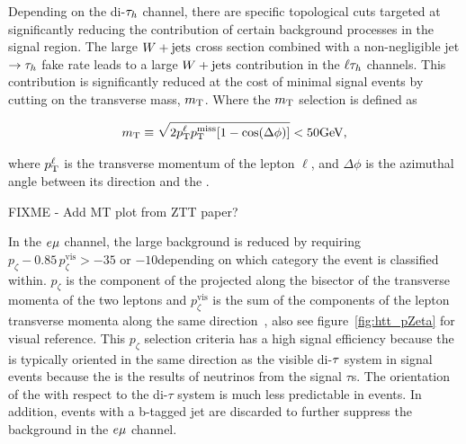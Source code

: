 Depending on the di-$\tau_{h}$ channel, there are specific topological cuts targeted at significantly
reducing the contribution of certain background processes in the signal region.  The large $W+\text{jets}$
cross section combined with a non-negligible jet $\to \tau_{h}$ fake rate leads to a large $W+\text{jets}$
contribution in the $\ell\tau_{h}$ channels.  This contribution is significantly reduced at the cost of
minimal signal events by cutting on the transverse mass, $m_\mathrm{T}$.  Where the $m_\mathrm{T}$ selection is defined as

\begin{equation}
m_\mathrm{T} \equiv \sqrt{\smash[b]{2 p_\mathrm{T}^\ell p_\mathrm{T}^\text{miss} [1-\cos(\Delta\phi)]}} < 50\mathrm{GeV},
\end{equation}

where $p_\mathrm{T}^\ell$ is the transverse momentum of the lepton $\ell$,
and $\Delta\phi$ is the azimuthal angle between its direction and the \etvecmiss.

FIXME - Add MT plot from ZTT paper?

In the $e\mu$ channel, the large \ttbar background is reduced by requiring 
$p_\zeta - 0.85 \, p_\zeta^{\text{vis}} > -35$ or $-10$\GeV depending on which category the event is
classified within.  $p_\zeta$ is the component of the \etvecmiss projected along the bisector 
of the transverse momenta of the two leptons and $p_\zeta^{\text{vis}}$ is the sum of the components 
of the lepton transverse momenta along the same direction~\cite{Khachatryan:2014wca}, also see
figure~\ref{fig:htt_pZeta} for visual reference.
This $p_\zeta$ selection criteria has a high signal efficiency because the \etvecmiss is typically oriented
in the same direction as the visible di-$\tau$ system in signal events because the \etvecmiss is 
the results of neutrinos from the signal $\tau$s.  The orientation of the \etvecmiss with respect
to the di-$\tau$ system is much less predictable in \ttbar events.  In addition, events with a b-tagged 
jet are discarded to further suppress the \ttbar background in the $e\mu$ channel.

